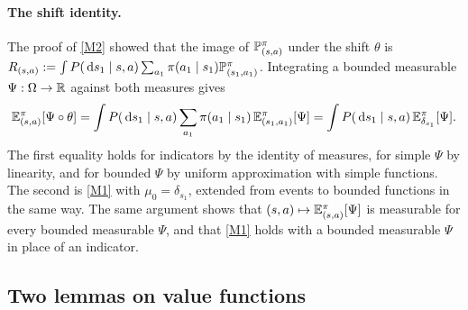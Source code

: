 \paragraph{The shift identity.}
The proof of \ref{M2} showed that the image of $\mathbb{P}^\pi_{(s,a)}$ under the shift $\theta$ is
$R_{(s,a)}:=\int P(\,\mathrm{d} s_1\mid s,a)\sum_{a_1}\pi(a_1\mid s_1)\mathbb{P}^\pi_{(s_1,a_1)}$.
Integrating a bounded measurable $\Psi:\Omega\to\mathbb{R}$ against both measures gives
\begin{equation}\label{eq:fb-shift}
\mathbb{E}^\pi_{(s,a)}[\Psi\circ\theta]=\int P(\,\mathrm{d} s_1\mid s,a)\sum_{a_1}\pi(a_1\mid s_1)\,\mathbb{E}^\pi_{(s_1,a_1)}[\Psi]
=\int P(\,\mathrm{d} s_1\mid s,a)\,\mathbb{E}^\pi_{\delta_{s_1}}[\Psi].
\end{equation}
The first equality holds for indicators by the identity of measures, for simple $\Psi$ by linearity, and for bounded $\Psi$ by uniform approximation with simple functions.
The second is \ref{M1} with $\mu_0=\delta_{s_1}$, extended from events to bounded functions in the same way.
The same argument shows that $(s,a)\mapsto\mathbb{E}^\pi_{(s,a)}[\Psi]$ is measurable for every bounded measurable $\Psi$, and that \ref{M1} holds with a bounded measurable $\Psi$ in place of an indicator.

\subsection{Two lemmas on value functions}\label{sec:fb-lemmas}


